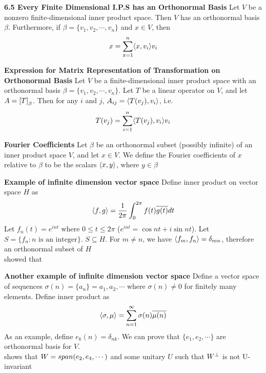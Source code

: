 \documentclass[11pt]{article}
\begin{document}
\begin{theorem*}
    \textbf{6.5 Every Finite Dimensional I.P.S has an Orthonormal Basis} Let $V$ be a nonzero finite-dimensional inner product space. Then $V$ has an orthonormal basis $\beta$. Furthermore, if $\beta = \{v_1, v_2,\cdots, v_n\}$ and $x\in V$, then 
    \[
        x = \sum_{x=1}^n \langle x,v_i\rangle v_i    
    \]
\end{theorem*}


\begin{corollary*}
    \textbf{Expression for Matrix Representation of Transformation on Orthonormal Basis} Let $V$ be a finite-dimensional inner product space with an orthonormal basis $\beta = \{v_1,v_2,\cdots, v_n\}$. Let $T$ be a linear operator on $V$, and let $A = \left[ T \right]_{\beta}$. Then for any $i$ and $j$, $A_{ij} = \langle T(v_j),v_i\rangle$, i.e. 
    \[
        T(v_j) = \sum_{i=1}^n \langle T(v_j),v_i\rangle  v_i  
    \]
\end{corollary*}


\begin{defn*}
    \textbf{Fourier Coefficients} Let $\beta$ be an orthonormal subset (possibly infinite) of an inner product space $V$, and let $x\in V$. We define the Fourier coefficients of $x$ relative to $\beta$ to be the scalars $\langle x,y\rangle$, where $y\in \beta$
\end{defn*}

\begin{defn*}
    \textbf{Example of infinite dimension vector space } Define inner product on vector space $H$ as
    \[
        \langle f,g\rangle = \frac{1}{2\pi}\int_{0}^{2\pi} f(t) \overline{g(t)} dt
    \]
    Let $f_n(t) = e^{int}$ where $0\leq t \leq 2\pi$ ($e^{int} = \cos nt + i\sin nt$). Let $S = \{ f_n : n \text{ is an integer} \}$. $S\subseteq H$. For $m\neq n$, we have $\langle f_m,f_n\rangle = \delta_{mn}$, therefore an orthonormal subset of $H$ \\
     showed that 
\end{defn*}

\begin{defn*}
    \textbf{Another example of infinite dimension vector space}  Define a vector space of sequences $\sigma(n) = \{ a_n\} = a_1, a_2,\cdots$ where $\sigma(n) \neq 0$ for finitely many elements. Define inner product as 
    \[
        \langle\sigma,\mu\rangle = \sum_{n=1}^{\infty} \sigma(n) \overline{\mu(n)}
    \]
     As an example, define $e_k(n) = \delta_{nk}$. We can prove that $\{e_1, e_2, \cdots \}$ are orthonormal basis for $V$. \\
     shows that $W = span(e_2, e_4, \cdots)$ and some unitary $U$ such that $W^{\perp}$ is not U-invariant
\end{defn*}
\end{document}
